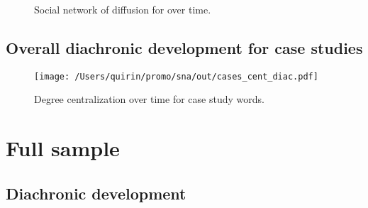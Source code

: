 \documentclass[
  a4paper,
  ]{scrartcl}
\begin{document}
    \begin{figure}[H]
      \caption{Social network of diffusion for  over time.}
      \centering
    \end{figure}

  \subsection{Overall diachronic development for case studies}

    \begin{figure}[H]
      \caption{Degree centralization over time for case study words.}
      \centering
      \texttt{[image: /Users/quirin/promo/sna/out/cases\_cent\_diac.pdf]}
    \end{figure}

\section{Full sample}

  \subsection{Diachronic development}
\end{document}
